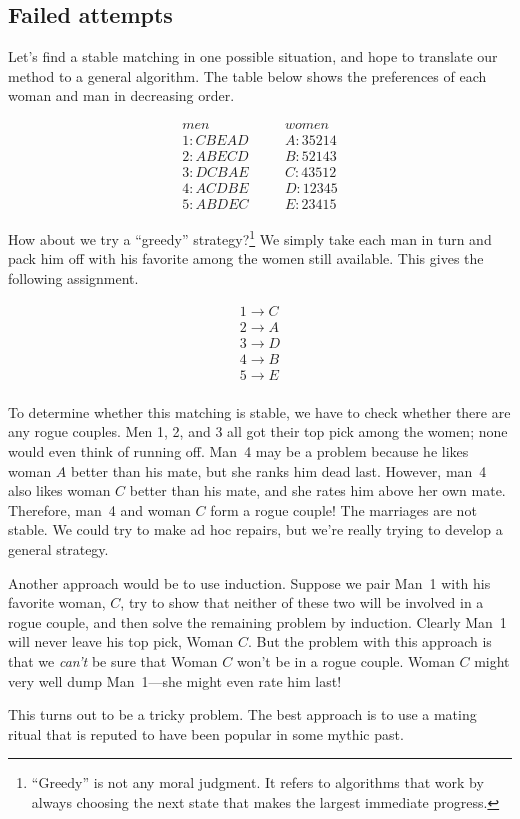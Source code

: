 \begin{editingnotes}
\subsection{Failed attempts}

Let's find a stable matching in one possible situation, and hope to
translate our method to a general algorithm.  The table below shows the
preferences of each woman and man in decreasing order.

\begin{eqnarray*}
men & \quad & women \\
1 : C B E A D & \quad & A : 3 5 2 1 4 \\
2 : A B E C D & \quad & B : 5 2 1 4 3 \\
3 : D C B A E & \quad & C : 4 3 5 1 2 \\
4 : A C D B E & \quad & D : 1 2 3 4 5 \\
5 : A B D E C & \quad & E : 2 3 4 1 5
\end{eqnarray*}

How about we try a ``greedy'' strategy?\footnote{``Greedy'' is not any
moral judgment.  It refers to algorithms that work by always choosing the
next state that makes the largest immediate progress.}  We simply take
each man in turn and pack him off with his favorite among the women still
available.  This gives the following assignment.

\begin{eqnarray*}
1 \rightarrow C \\
2 \rightarrow A \\
3 \rightarrow D \\
4 \rightarrow B \\
5 \rightarrow E \\
\end{eqnarray*}

To determine whether this matching is stable, we have to check whether
there are any rogue couples.  Men 1, 2, and 3 all got their top pick
among the women; none would even think of running off.  Man~4 may be a
problem because he likes woman $A$ better than his mate, but she ranks him
dead last.  However, man~4 also likes woman $C$ better than his mate, and
she rates him above her own mate.  Therefore, man~4 and woman $C$ form a
rogue couple!  The marriages are not stable.  We could try to make ad hoc
repairs, but we're really trying to develop a general strategy.

Another approach would be to use induction.  Suppose we pair Man~1
with his favorite woman, $C$, try to show that neither of these two
will be involved in a rogue couple, and then solve the remaining
problem by induction.  Clearly Man~1 will never leave his top pick,
Woman $C$.  But the problem with this approach is that we \emph{can't}
be sure that Woman $C$ won't be in a rogue couple.  Woman $C$ might very
well dump Man~1---she might even rate him last!

This turns out to be a tricky problem.  The best approach is to use a
mating ritual that is reputed to have been popular in some mythic past.
\end{editingnotes}

